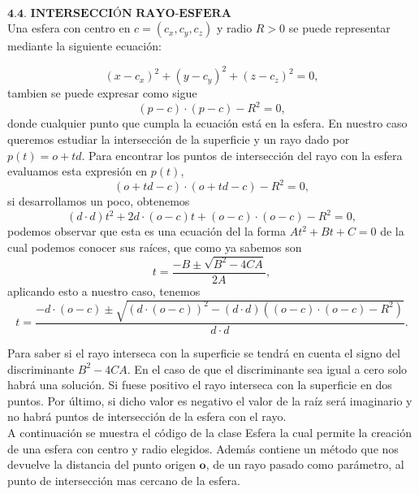 ${ }$\\
$\textbf{4.4. INTERSECCIÓN RAYO-ESFERA}$
${ }$\\

Una esfera con centro en $c = (c_x, c_y, c_z)$ y radio $R>0$ se puede representar mediante la siguiente ecuación:

\[
	(x-c_x)^2 + (y-c_y)^2 + (z-c_z)^2 = 0,
\]
tambien se puede expresar como sigue
\[
	(p-c)\cdot(p-c) - R^2 = 0,
\]
donde cualquier punto que cumpla la ecuación está en la esfera. En nuestro caso queremos estudiar la intersección de la superficie y un rayo dado por $p(t) = o + td$. Para encontrar los puntos de intersección del rayo con la esfera evaluamos esta expresión en $p(t)$,
\[
	(o+td-c)\cdot(o+td-c) - R^2 = 0,
\]
si desarrollamos un poco, obtenemos
\[
	(d\cdot d)t^2 + 2d\cdot (o-c)t + (o-c)\cdot(o-c) - R^2 = 0,
\]
podemos observar que esta es una ecuación del la forma $At^2+Bt+C=0$ de la cual podemos conocer sus raíces, que como ya sabemos son
\[
	t = \frac{-B\pm \sqrt{B^2-4CA}}{2A},
\]
aplicando esto a nuestro caso, tenemos
\[
	t = \frac{-d\cdot (o-c) \pm \sqrt{(d\cdot (o-c))^2 - (d\cdot d)((o-c)\cdot(o-c)-R^2)}}{d\cdot d}.
\]

Para saber si el rayo interseca con la superficie se tendrá en cuenta el signo del discriminante $B^2-4CA$. En el caso de que el discriminante sea igual a cero solo habrá una solución. Si fuese positivo el rayo interseca con la superficie en dos puntos. Por último, si dicho valor es negativo el valor de la raíz será imaginario y no habrá puntos de intersección de la esfera con el rayo.
	${ }$\\	
	
A continuación se muestra el código de la clase Esfera la cual permite la creación de una esfera con centro y radio elegidos. Además contiene un método que nos devuelve la distancia del punto origen $\textbf{o}$, de un rayo pasado como parámetro, al punto de intersección mas cercano de la esfera.


